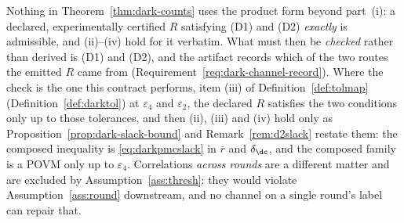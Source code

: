 
\begin{remark}\label{rem:corrdark}
Nothing in Theorem~\ref{thm:dark-counts} uses the product form beyond part~(i): a
declared, experimentally certified $R$ satisfying (D1) and (D2)
\emph{exactly} is admissible, and (ii)--(iv) hold for it verbatim. What must
then be \emph{checked} rather than derived is (D1) and (D2), and the artifact
records which of the two routes the emitted $R$ came from
(Requirement~\ref{req:dark-channel-record}). Where the check is the one this
contract performs, item (iii) of Definition~\ref{def:tolmap}
(Definition~\ref{def:darktol}) at $\varepsilon_4$ and $\varepsilon_2$, the
declared $R$ satisfies the two conditions only up to those tolerances, and
then (ii), (iii) and (iv) hold only as Proposition~\ref{prop:dark-slack-bound}
and Remark~\ref{rem:d2slack} restate them: the composed inequality is
\eqref{eq:darkpmcslack} in $\bar r$ and $\delta_{\dc}$, and the composed family
is a POVM only up to $\varepsilon_4$. Correlations \emph{across rounds} are a
different matter and are excluded by Assumption~\ref{ass:thresh}: they would
violate Assumption~\ref{ass:round} downstream, and no channel on a single
round's label can repair that.
\end{remark}
